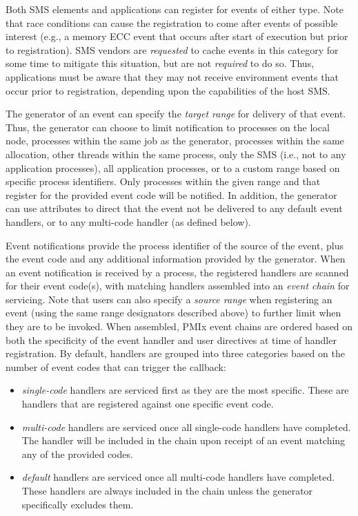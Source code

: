 Both \ac{SMS} elements and applications can register for events of either type. Note that race conditions can cause the registration to come after events of possible interest (e.g., a memory \ac{ECC} event that occurs after start of execution but prior to registration). \ac{SMS} vendors are \textit{requested} to cache events in this category for some time to mitigate this situation, but are not \textit{required} to do so. Thus, applications must be aware that they may not receive environment events that occur prior to registration, depending upon the capabilities of the host \ac{SMS}.

The generator of an event can specify the \textit{target range} for delivery of that event. Thus, the generator can choose to limit notification to processes on the local node, processes within the same job as the generator, processes within the same allocation, other threads within the same process, only the \ac{SMS} (i.e., not to any application processes), all application processes, or to a custom range based on specific process identifiers. Only processes within the given range and that register for the provided event code will be notified. In addition, the generator can use attributes to direct that the event not be delivered to any default event handlers, or to any multi-code handler (as defined below).

Event notifications provide the process identifier of the source of the event, plus the event code and any additional information provided by the generator. When an event notification is received by a process, the registered handlers are scanned for their event code(s), with matching handlers assembled into an \textit{event chain} for servicing. Note that users can also specify a \textit{source range} when registering an event (using the same range designators described above) to further limit when they are to be invoked. When assembled, PMIx event chains are ordered based on both the specificity of the event handler and user directives at time of handler registration. By default, handlers are grouped into three categories based on the number of event codes that can trigger the callback:
\begin{itemize}
\item \textit{single-code} handlers are serviced first as they are the most specific. These are handlers that are registered against one specific event code.

\item \textit{multi-code} handlers are serviced once all single-code handlers have completed. The handler will be included in the chain upon receipt of an event matching any of the provided codes.

\item \textit{default} handlers are serviced once all multi-code handlers have completed. These handlers are always included in the chain unless the generator specifically excludes them.
\end{itemize}

